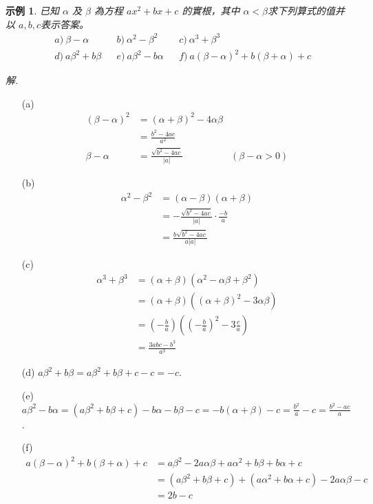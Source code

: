 \documentclass[12pt]{article}
\newtheorem{example}{示例}
\begin{document}
    \begin{example}
        已知 $\alpha$ 及 $\beta$ 為方程 $ax^2+bx+c$ 的實根，其中 $\alpha<\beta$求下列算式的值并以 $a,b,c$表示答案。\begin{align*}
            &a)\ \beta-\alpha&&b)\ \alpha^2-\beta^2&&c)\ \alpha^3+\beta^3\\
            &d)\ a\beta^2+b\beta&&e)\ a\beta^2-b\alpha&&f)\ a(\beta-\alpha)^2+b(\beta+\alpha)+c
        \end{align*}
    \end{example}

    \textit{ 解.}\begin{enumerate}
        \item[(a)] \begin{align*}
            (\beta-\alpha)^2&=(\alpha+\beta)^2-4\alpha\beta\\
            &=\frac{b^2-4ac}{a^2}\\
            \beta-\alpha&=\frac{\sqrt{b^2-4ac}}{|a|}&(\beta-\alpha>0)
        \end{align*} 
        \item[(b)] \begin{align*}
            \alpha^2-\beta^2&=(\alpha-\beta)(\alpha+\beta)\\
            &=-\frac{\sqrt{b^2-4ac}}{|a|}\cdot \frac{-b}{a}\\
            &=\frac{b\sqrt{b^2-4ac}}{a|a|}
        \end{align*}
        \item[(c)] \begin{align*}
            \alpha^3+\beta^3&=(\alpha+\beta)(\alpha^2-\alpha\beta+\beta^2)\\
            &=(\alpha+\beta)((\alpha+\beta)^2-3\alpha\beta)\\
            &=(-\frac{b}{a})((-\frac{b}{a})^2-3\frac{c}{a})\\
            &=\frac{3abc-b^3}{a^3}
        \end{align*}
        \item[(d)] $a\beta^2+b\beta=a\beta^2+b\beta+c-c=-c$.
        \item[(e)] $\displaystyle a\beta^2-b\alpha=(a\beta^2+b\beta+c)-b\alpha-b\beta-c=-b(\alpha+\beta)-c=\frac{b^2}{a}-c=\frac{b^2-ac}{a}$.
        \item[(f)] \begin{align*}
            a(\beta-\alpha)^2+b(\beta+\alpha)+c&=a\beta^2-2a\alpha\beta+a\alpha^2+b\beta+b\alpha+c\\
            &=(a\beta^2+b\beta+c)+(a\alpha^2+b\alpha+c)-2a\alpha\beta-c\\
            &=2b-c
        \end{align*}
    \end{enumerate}
\end{document}
